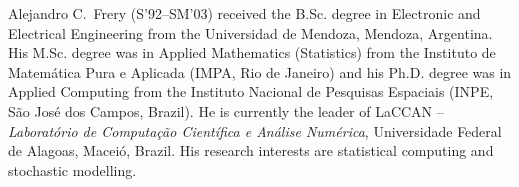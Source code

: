 \documentclass[journal]{IEEEtran}
\numberwithin{equation}{section}
\begin{document}
\begin{IEEEbiography}{Alejandro C.\ Frery} (S'92--SM'03)
	received the B.Sc. degree in Electronic and Electrical Engineering from the Universidad de Mendoza, Mendoza, Argentina.
	His M.Sc. degree was in Applied Mathematics (Statistics) from the Instituto de Matem\'atica Pura e Aplicada (IMPA, Rio de Janeiro) and his Ph.D. degree was in Applied Computing from the Instituto Nacional de Pesquisas Espaciais (INPE, S\~ao Jos\'e dos Campos, Brazil).
	He is currently the leader of LaCCAN -- \textit{Laborat\'orio de Computa\c c\~ao Cient\'ifica e An\'alise Num\'erica}, Universidade Federal de Alagoas, Macei\'o, Brazil.
	His research interests are statistical computing and stochastic modelling.
\end{IEEEbiography}

\vspace{11cm}
\end{document}
